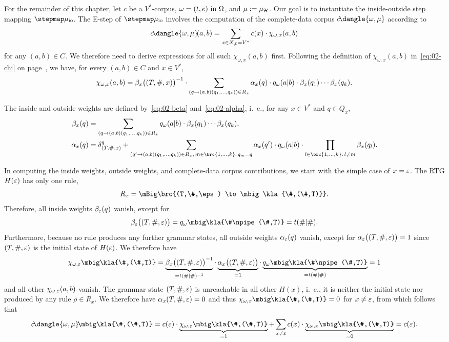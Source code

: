 For the remainder of this chapter, let $c$ be a $V^*$-corpus,
$\omega=(t,e)\text{ in }\Omega$, and $\mu := \mu_\mathcal H$. Our goal is to instantiate the
inside-outside step mapping $\stepmap\mu_\mathrm{io}$. The E-step of
$\stepmap\mu_\mathrm{io}$ involves the computation of the complete-data corpus
$c\!\dangle{\omega,\mu}$ according to
\begin{equation}\label{eq:03-c}
 c\!\dangle{\omega,\mu}\!(a,b) = \sum_{x\in X_{\not\bot}=V^*} c(x) \cdot \chi_{\omega,x}(a,b)
\end{equation}
for any $(a,b)\in C$.  We therefore need to derive expressions for all such
$\chi_{\omega,x}(a,b)$ first. Following the definition of
$\chi_{\omega,x}(a,b)$ in~\eqref{eq:02-chi} on page~\pageref{eq:02-chi}, we
have, for every $(a,b)\in C$ and $x\in V^*$,
\begin{equation}\label{eq:03-chi}
 \chi_{\omega,x}(a,b) = \beta_x\bigl((T,\#,x)\bigr)^{-1} \cdot \sum_{(q\to(a,b)(q_1,\ldots,q_k))\in R_x} \alpha_x(q) \cdot q_\omega(a|b) \cdot \beta_x(q_1) \cdots \beta_x(q_k).
\end{equation}

The inside and outside weights are defined by~\eqref{eq:02-beta}
and~\eqref{eq:02-alpha}, i.~e., for any $x\in V^*$ and $q\in Q_x$,
\begin{align}
 \beta_x(q) &= \sum_{(q\to(a,b)(q_1,\ldots,q_k))\in R_x} q_\omega(a|b) \cdot \beta_x(q_1) \cdots \beta_x(q_k), \label{eq:03-beta} \\
 \alpha_x(q) &= \delta_{(T,\#,x)}^q + \sum_{(q'\to(a,b)(q_1,\ldots,q_k))\in R_x,\,m\in\brc{1,\ldots,k}:\,q_m=q} \alpha_x(q') \cdot q_\omega(a|b) \cdot \prod_{l\in\brc{1,\ldots,k}:\,l\neq m} \beta_x(q_l). \label{eq:03-alpha}
\end{align}

In computing the inside weights, outside weights, and complete-data corpus
contributions, we start with the simple case of $x=\varepsilon$. The RTG $H(\varepsilon)$ has
only one rule,
\[
 R_x = \mBig\brc{(T,\#,\eps) \to \mbig\kla{\#,(\#,T)}}.
\]
Therefore, all inside weights $\beta_\varepsilon(q)$ vanish, except for
\label{eq:03-beta-eps}\[
 \beta_\eps\doublekla{T,\#,\eps} = q_\omega\mbig\kla{\#\npipe(\#,T)} = t(\#|\#).
\]
Furthermore, because no rule produces any further grammar states, all outside
weights $\alpha_\varepsilon(q)$ vanish, except for $\alpha_\varepsilon\bigl((T,\#,\varepsilon)\bigr) =
1$ \label{eq:03-alpha-eps} since $(T,\#,\varepsilon)$ is the initial state of
$H(\varepsilon)$. We therefore have
\[
 \chi_{\omega,\eps}\mbig\kla{\#,(\#,T)} = \underbrace{\beta_x\doublekla{T,\#,\eps}^{-1}}_{=t(\#|\#)^{-1}} \cdot \underbrace{\alpha_x\doublekla{T,\#,\eps}}_{=1} \cdot \underbrace{q_\omega\mbig\kla{\#\npipe(\#,T)}}_{=t(\#|\#)} = 1
\]
and all other $\chi_{\omega,\varepsilon}(a,b)$ vanish. The grammar state $(T,\#,\varepsilon)$
is unreachable in all other $H(x)$, i.~e., it is neither the initial state nor
produced by any rule $\rho\in R_x$. We therefore have $\alpha_x(T,\#,\varepsilon) = 0$
and thus $\chi_{\omega,x}\mbig\kla{\#,(\#,T)}=0$ for $x\neq\varepsilon$, from which
follows that
\[
 c\!\dangle{\omega,\mu}\!\mbig\kla{\#,(\#,T)} = c(\eps) \cdot \underbrace{\chi_{\omega,\eps}\mbig\kla{\#,(\#,T)}}_{=1} + \sum_{x\neq\eps} c(x) \cdot \underbrace{\chi_{\omega,x}\mbig\kla{\#,(\#,T)}}_{=0} = c(\eps).
\]

